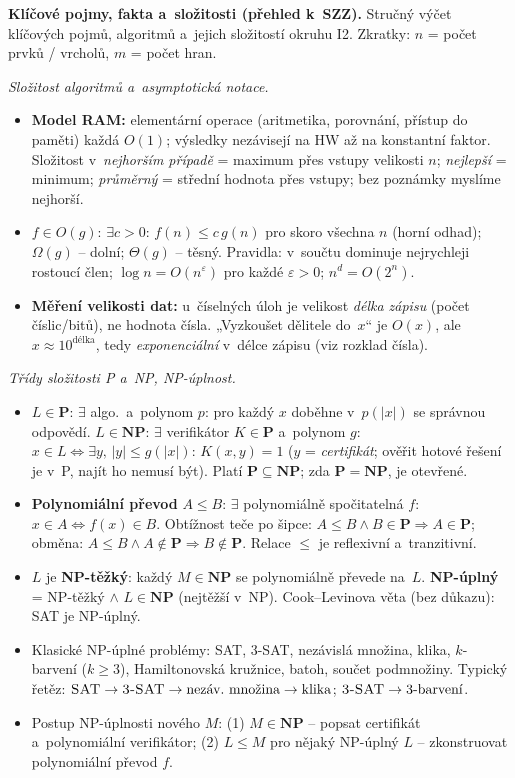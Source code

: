 \documentclass[11pt,a4paper]{article}
\begin{document}
\begin{poznamka}
\textbf{Klíčové pojmy, fakta a~složitosti (přehled k~SZZ).} Stručný výčet klíčových pojmů, algoritmů a~jejich složitostí okruhu I2. Zkratky: $n$ = počet prvků / vrcholů, $m$ = počet hran.

\smallskip
\emph{Složitost algoritmů a~asymptotická notace.}
\begin{itemize}
  \item \textbf{Model RAM:} elementární operace (aritmetika, porovnání, přístup do paměti) každá $O(1)$; výsledky nezávisejí na HW až na konstantní faktor. Složitost v~\emph{nejhorším případě} = maximum přes vstupy velikosti $n$; \emph{nejlepší} = minimum; \emph{průměrný} = střední hodnota přes vstupy; bez poznámky myslíme nejhorší.
  \item $f\in O(g)$: $\exists c>0:\,f(n)\le c\,g(n)$ pro skoro všechna $n$ (horní odhad); $\Omega(g)$ -- dolní; $\Theta(g)$ -- těsný. Pravidla: v~součtu dominuje nejrychleji rostoucí člen; $\log n=O(n^\varepsilon)$ pro každé $\varepsilon>0$; $n^d=O(2^n)$.
  \item \textbf{Měření velikosti dat:} u~číselných úloh je velikost \emph{délka zápisu} (počet číslic/bitů), ne hodnota čísla. „Vyzkoušet dělitele do~$x$`` je $O(x)$, ale $x\approx 10^{\text{délka}}$, tedy \emph{exponenciální} v~délce zápisu (viz rozklad čísla).
\end{itemize}

\smallskip
\emph{Třídy složitosti P a~NP, NP-úplnost.}
\begin{itemize}
  \item $L\in\mathbf{P}$: $\exists$ algo.\ a~polynom $p$: pro každý $x$ doběhne v~$p(|x|)$ se správnou odpovědí. $L\in\mathbf{NP}$: $\exists$ verifikátor $K\in\mathbf{P}$ a~polynom $g$: $x\in L\Leftrightarrow\exists y,\,|y|\le g(|x|):\,K(x,y){=}1$ ($y$ = \emph{certifikát}; ověřit hotové řešení je v~P, najít ho nemusí být). Platí $\mathbf{P}\subseteq\mathbf{NP}$; zda $\mathbf{P}{=}\mathbf{NP}$, je otevřené.
  \item \textbf{Polynomiální převod} $A\le B$: $\exists$ polynomiálně spočitatelná $f$: $x\in A\Leftrightarrow f(x)\in B$. Obtížnost teče po šipce: $A\le B\wedge B\in\mathbf{P}\Rightarrow A\in\mathbf{P}$; obměna: $A\le B\wedge A\notin\mathbf{P}\Rightarrow B\notin\mathbf{P}$. Relace $\le$ je reflexivní a~tranzitivní.
  \item $L$ je \textbf{NP-těžký}: každý $M\in\mathbf{NP}$ se polynomiálně převede na~$L$. \textbf{NP-úplný} = NP-těžký $\wedge$ $L\in\mathbf{NP}$ (nejtěžší v~NP). Cook--Levinova věta (bez důkazu): \textsc{SAT} je NP-úplný.
  \item Klasické NP-úplné problémy: \textsc{SAT}, \textsc{3-SAT}, nezávislá množina, klika, $k$-barvení ($k\ge3$), Hamiltonovská kružnice, batoh, součet podmnožiny. Typický řetěz: $\textsc{SAT}\to\textsc{3-SAT}\to\text{nezáv.\ množina}\to\text{klika}$; $\textsc{3-SAT}\to\text{3-barvení}$.
  \item Postup NP-úplnosti nového $M$: (1) $M\in\mathbf{NP}$ -- popsat certifikát a~polynomiální verifikátor; (2) $L\le M$ pro nějaký NP-úplný $L$ -- zkonstruovat polynomiální převod $f$.
\end{itemize}


\end{poznamka}
\end{document}
